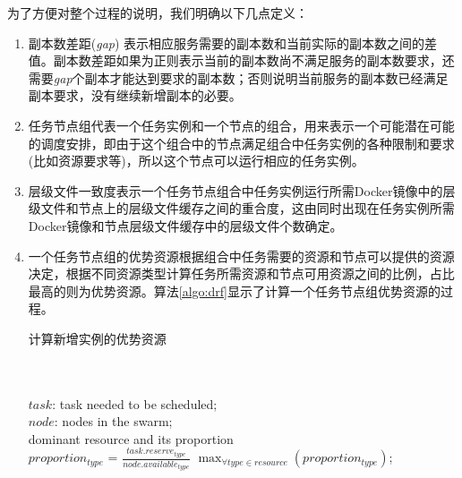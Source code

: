 为了方便对整个过程的说明，我们明确以下几点定义：
\begin{enumerate}
\item 副本数差距(\emph{gap}) 表示相应服务需要的副本数和当前实际的副本数之间的差值。副本数差距如果为正则表示当前的副本数尚不满足服务的副本数要求，还需要\emph{gap}个副本才能达到要求的副本数；否则说明当前服务的副本数已经满足副本要求，没有继续新增副本的必要。
\item 任务节点组代表一个任务实例和一个节点的组合，用来表示一个可能潜在可能的调度安排，即由于这个组合中的节点满足组合中任务实例的各种限制和要求(比如资源要求等)，所以这个节点可以运行相应的任务实例。
\item 层级文件一致度表示一个任务节点组合中任务实例运行所需Docker镜像中的层级文件和节点上的层级文件缓存之间的重合度，这由同时出现在任务实例所需Docker镜像和节点层级文件缓存中的层级文件个数确定。
\item 一个任务节点组的优势资源根据组合中任务需要的资源和节点可以提供的资源决定，根据不同资源类型计算任务所需资源和节点可用资源之间的比例，占比最高的则为优势资源。算法\ref{algo:drf}显示了计算一个任务节点组优势资源的过程。
\begin{algorithm}[H]
\caption{计算新增实例的优势资源}
\label{algo:drf}
\begin{algorithmic}[0]
\\
\Require ~~\
\\
$task$: task needed to be scheduled;\\
$node$: nodes in the swarm;
\Ensure ~~\
\\
dominant resource and its proportion\\

    \State $proportion_{type}$ = $\frac{task.reserve_{type}}{node.available_{type}}$
    \EndFor
    \State \Return $\max_{\forall type \in resource} {(proportion_{type})}$;
\EndFunction
\end{algorithmic}
\end{algorithm}
\end{enumerate}

